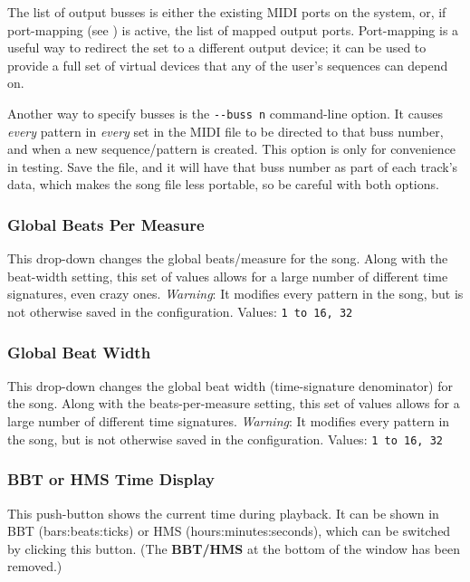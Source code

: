    The list of
   output busses is either the existing MIDI ports on the system, or,
   if port-mapping (see ) is active, the list
   of mapped output ports.
   Port-mapping is a useful way to redirect the set to a different output
   device; it can be used to provide a full set of virtual devices that any of
   the user's sequences can depend on.

   Another way to specify busses is the
   \texttt{-{}-buss n} command-line option.
   It causes \textsl{every} pattern in \textsl{every} set in the MIDI
   file to be directed to that buss number, and when a new
   sequence/pattern is created.  This option is only
   for convenience in testing.  Save the file, and it will
   have that buss number as part of each track's data, which makes the song
   file less portable, so be careful with both options.

\subsubsection{Global Beats Per Measure}
\label{subsubsec:introduction_global_beats_per_measure}

   This drop-down changes the global beats/measure for the song.
   Along with the beat-width setting, this set of values allows
   for a large number of different time signatures, even crazy ones.
   \textsl{Warning}: It modifies every pattern in the song, but is not
   otherwise saved in the configuration.
   Values: \texttt{1 to 16, 32}

\subsubsection{Global Beat Width}
\label{subsubsec:introduction_global_beat_width}

   This drop-down changes the global beat width (time-signature denominator)
   for the song.
   Along with the beats-per-measure setting, this set of values allows
   for a large number of different time signatures.
   \textsl{Warning}: It modifies every pattern in the song, but is not
   otherwise saved in the configuration.
   Values: \texttt{1 to 16, 32}

\subsubsection{BBT or HMS Time Display}
\label{subsubsec:introduction_time_display}

   This push-button shows the current time during playback. 
   It can be shown in BBT (bars:beats:ticks) or HMS (hours:minutes:seconds),
   which can be switched by clicking this button.
   (The \textbf{BBT/HMS} at the bottom of the window has been removed.)

